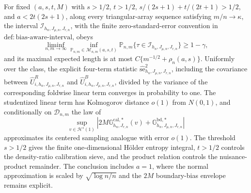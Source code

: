 For fixed \((a,s,t,M)\) with \(s>1/2\), \(t>1/2\), \(s/(2s+1)+t/(2t+1)>1/2\), and \(a<2t(2s+1)\), along every triangular-array sequence satisfying \(m/n\to\kappa\), the interval \(\mathcal I_{h_n,J_{\mu,n},J_{r,n}}\), with the finite zero-standard-error convention in \(\mathrm{def:bias\text{-}aware\text{-}interval}\), obeys
\[
\liminf_{n,m\to\infty}\inf_{\mathbb P_{n,m}\in\mathcal M_{n,m}(a,s,t)}\mathbb P_{n,m}\{\tau\in\mathcal I_{h_n,J_{\mu,n},J_{r,n}}\}\ge1-\gamma,
\]
and its maximal expected length is at most \(C\{m^{-1/2}+\rho_n(a,s)\}\). Uniformly over the class, the explicit four-term statistic \(\widehat{\mathrm{se}}_{h_n,J_{\mu,n},J_{r,n}}^2\), including the covariance between \(\widehat U^R_{i,h_n,J_{\mu,n},J_{r,n}}\) and \(\widehat U^B_{i,h_n,J_{\mu,n},J_{r,n}}\), divided by the variance of the corresponding foldwise linear term converges in probability to one. The studentized linear term has Kolmogorov distance \(o(1)\) from \(N(0,1)\), and conditionally on \(\mathcal D_{n,m}\) the law of
\[
\sup_{v\in\mathcal H^s(1)}|2M\mathbb G^{\mathrm{cal},*}_{h_n,J_{r,n}}(v)+\mathbb G^{\mathrm{bd},*}_{h_n,J_{\mu,n},J_{r,n}}|
\]
approximates its centered sampling analogue with error \(o(1)\). The threshold \(s>1/2\) gives the finite one-dimensional Hölder entropy integral, \(t>1/2\) controls the density-ratio calibration sieve, and the product relation controls the nuisance-product remainder. The conclusion includes \(a=1\), where the normal approximation is scaled by \(\sqrt{\log n/n}\) and the \(2M\) boundary-bias envelope remains explicit.